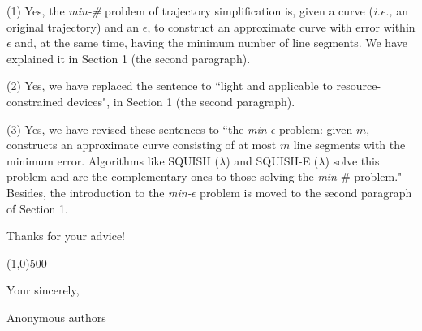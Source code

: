 \documentclass{letter}
\newcommand{\ie}{\emph{i.e.,}\xspace}
\begin{document}
(1) Yes, the \emph{min-\#} problem of trajectory simplification is, given a curve (\ie an original trajectory) and an $\epsilon$, to construct an approximate curve with error within $\epsilon$ and, at the same time, having the minimum number of line segments. We have explained it in Section 1 (the second paragraph). 

(2) Yes, we have replaced the sentence to ``light and applicable to resource-constrained devices", in Section 1 (the second paragraph). 

(3) Yes, we have revised these sentences to ``the \emph{min-$\epsilon$} problem: given $m$, constructs an approximate curve consisting of at most $m$ line segments with the minimum error. Algorithms like SQUISH ($\lambda$) and SQUISH-E ($\lambda$) solve this problem and are the complementary ones to those solving the \emph{min-$\#$} problem." Besides, the introduction to the \emph{min-$\epsilon$} problem is moved to the second paragraph of Section 1.

Thanks for your advice!

\line(1,0){500}



Your sincerely,

Anonymous authors

%
%
\end{document}
